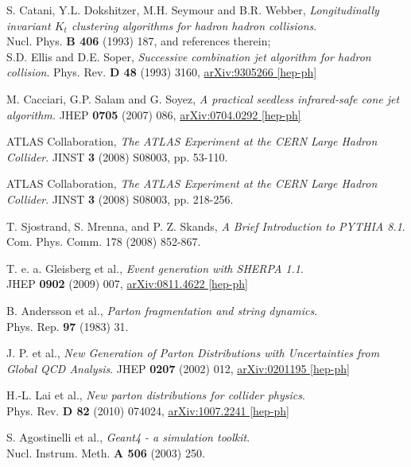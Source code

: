 \documentclass[12pt, twoside]{article}
\numberwithin{equation}{section}
\numberwithin{figure}{section}
\begin{document}
\begin{thebibliography}{99}
 S. Catani, Y.L. Dokshitzer, M.H. Seymour and B.R. Webber, \textit{Longitudinally invariant $K_{t}$ clustering algorithms for hadron hadron collisions}.\\
Nucl. Phys. \textbf{B 406} (1993) 187, and references therein;\\
S.D. Ellis and D.E. Soper, \textit{Successive combination jet algorithm for hadron collision}. Phys. Rev. \textbf{D 48} (1993) 3160, \href{http://arxiv.org/abs/hep-ph/9305266}{arXiv:9305266 [hep-ph]}

 M. Cacciari, G.P. Salam and G. Soyez, \textit{A practical seedless infrared-safe cone jet algorithm.} JHEP \textbf{0705} (2007) 086, \href{http://arxiv.org/abs/0704.0292}{arXiv:0704.0292 [hep-ph]}

 ATLAS Collaboration, \textit{The ATLAS Experiment at the CERN Large Hadron Collider}. JINST \textbf{3} (2008) S08003, pp. 53-110.

 ATLAS Collaboration, \textit{The ATLAS Experiment at the CERN Large Hadron Collider}. JINST \textbf{3} (2008) S08003, pp. 218-256.

 T. Sjostrand, S. Mrenna, and P. Z. Skands, \textit{A Brief Introduction to PYTHIA 8.1}. Com. Phys. Comm. 178 (2008) 852-867.

 T. e. a. Gleisberg et al., \textit{Event generation with SHERPA 1.1}.\\
JHEP \textbf{0902} (2009) 007, \href{http://arxiv.org/abs/0811.4622}{arXiv:0811.4622 [hep-ph]}

 B. Andersson et al., \textit{Parton fragmentation and string dynamics}.\\
Phys. Rep. \textbf{97} (1983) 31.

 J. P. et al., \textit{New Generation of Parton Distributions with Uncertainties from Global QCD Analysis}. JHEP \textbf{0207} (2002) 012, \href{http://arxiv.org/abs/hep-ph/0201195}{arXiv:0201195 [hep-ph]}

 H.-L. Lai et al., \textit{New parton distributions for collider physics}.\\
Phys. Rev. \textbf{D 82} (2010) 074024, \href{http://arxiv.org/abs/1007.2241}{arXiv:1007.2241 [hep-ph]}

 S. Agostinelli et al., \textit{Geant4 - a simulation toolkit}.\\
Nucl. Instrum. Meth. \textbf{A 506} (2003) 250.


\end{thebibliography}
\end{document}
